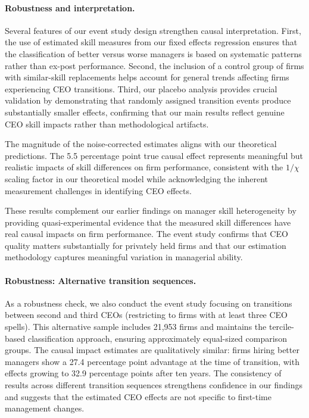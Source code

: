 \documentclass[11pt,a4paper]{article}
\begin{document}
\paragraph{Robustness and interpretation.} Several features of our event study design strengthen causal interpretation. First, the use of estimated skill measures from our fixed effects regression ensures that the classification of better versus worse managers is based on systematic patterns rather than ex-post performance. Second, the inclusion of a control group of firms with similar-skill replacements helps account for general trends affecting firms experiencing CEO transitions. Third, our placebo analysis provides crucial validation by demonstrating that randomly assigned transition events produce substantially smaller effects, confirming that our main results reflect genuine CEO skill impacts rather than methodological artifacts.

The magnitude of the noise-corrected estimates aligns with our theoretical predictions. The 5.5 percentage point true causal effect represents meaningful but realistic impacts of skill differences on firm performance, consistent with the $1/\chi$ scaling factor in our theoretical model while acknowledging the inherent measurement challenges in identifying CEO effects.

These results complement our earlier findings on manager skill heterogeneity by providing quasi-experimental evidence that the measured skill differences have real causal impacts on firm performance. The event study confirms that CEO quality matters substantially for privately held firms and that our estimation methodology captures meaningful variation in managerial ability.

\paragraph{Robustness: Alternative transition sequences.} As a robustness check, we also conduct the event study focusing on transitions between second and third CEOs (restricting to firms with at least three CEO spells). This alternative sample includes 21,953 firms and maintains the tercile-based classification approach, ensuring approximately equal-sized comparison groups. The causal impact estimates are qualitatively similar: firms hiring better managers show a 27.4 percentage point advantage at the time of transition, with effects growing to 32.9 percentage points after ten years. The consistency of results across different transition sequences strengthens confidence in our findings and suggests that the estimated CEO effects are not specific to first-time management changes.
\end{document}
